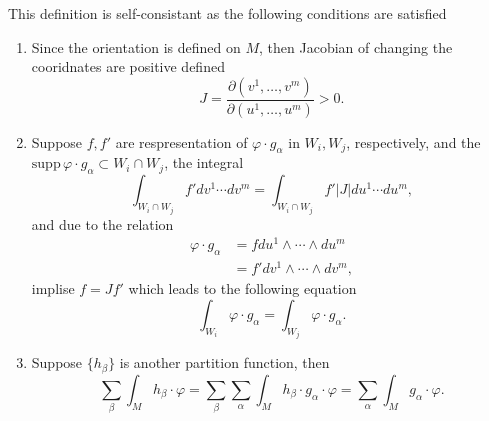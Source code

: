 This definition is self-consistant as the following conditions are satisfied
\begin{enumerate}
\item Since the orientation is defined on $M$, then Jacobian of changing the cooridnates are positive defined
\begin{equation*}
J=\frac{\partial(v^1,\dots,v^m)}{\partial(u^1,\dots,u^m)}>0.
\end{equation*}
\item Suppose $f,f'$ are respresentation of $\varphi\cdot g_\alpha$ in $W_i,W_j$, respectively, and the $\text{supp}\,\varphi\cdot g_\alpha\subset W_i\cap W_j$, the integral
\begin{equation*}
\int_{W_i\cap W_j}f'dv^1\cdots dv^m=\int_{W_i\cap W_j}f'|J|du^1\cdots du^m,
\end{equation*}
and due to the relation
\begin{equation*}
\begin{aligned}
\varphi\cdot g_\alpha& = fdu^1\wedge\cdots\wedge du^m\\
&=f'dv^1\wedge\cdots\wedge dv^m,
\end{aligned}
\end{equation*}
implise $f=Jf'$ which leads to the following equation
\begin{equation}
\int_{W_i}\varphi\cdot g_\alpha=\int_{W_j}\varphi\cdot g_\alpha.
\end{equation}
\item Suppose $\{h_\beta\}$ is another partition function, then
\begin{equation*}
\sum_\beta\int_Mh_\beta\cdot\varphi=\sum_\beta\sum_\alpha\int_Mh_\beta \cdot g_\alpha\cdot \varphi=\sum_\alpha\int_Mg_\alpha\cdot\varphi.
\end{equation*}
\end{enumerate} 

